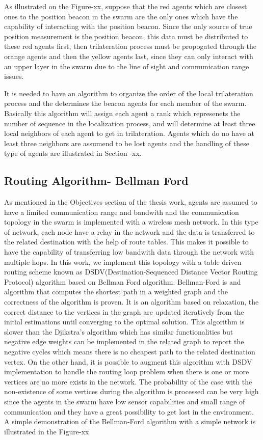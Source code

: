 \documentclass[twoside]{article}
\begin{document}
	As illustrated on the Figure-xx, suppose that the red agents which are closest ones to the position beacon in the swarm are the only ones which have the capability of interacting with the position beacon. Since the only source of true position measurement is the position beacon, this data must be distributed to these red agents first, then trilateration process must be propogated through the orange agents and then the yellow agents last, since they can only interact with an upper layer in the swarm due to the line of sight and communication range issues.
	
	It is needed to have an algorithm to organize the order of the local trilateration process and the determines the beacon agents for each member of the swarm. Basically this algorithm will assign each agent a rank which represenets the number of sequence in the localization process, and will determine at least three local neighbors of each agent to get in trilateration. Agents which do no have at least three neighbors are assumend to be lost agents and the handling of these type of agents are illustrated in Section -xx.
	
	\subsection{Routing Algorithm- Bellman Ford}
	As mentioned in the Objectives section of the thesis work, agents are assumed to have a limited communication range and bandwith and the communication topology in the swarm is implemented with a wireless mesh network. In this type of network, each node have a relay in the network and the data is transferred to the related destination with the help of route tables. This makes it possible to have the capability of transferring low bandwith data through the network with multiple hops.  In this work, we implement this topology with a table driven routing scheme known as DSDV(Destination-Sequenced Distance Vector Routing Protocol) algorithm based on Bellman Ford algorithm. Bellman-Ford is and algorithm that computes the shortest path in a weighted graph and the correctness of the algorithm is proven. It is an algorithm based on relaxation, the correct distance to the vertices in the graph are updated iteratively from the initial estimations until converging to the optimal solution. This algorithm is slower than the Djikstra's algorithm which has similar functionalities but negative edge weights can be implemented in the related graph to report the negative cycles which means there is no cheapest path to the related destination vertex. On the other hand, it is possible to augment this algorithm with DSDV implementation to handle the routing loop problem when there is one or more vertices are no more exists in the network. The probability of the case with the non-existence of some vertices during the algorithm is processed can be very high since the agents in the swarm have low sensor capabilities and small range of communication and they have a great possibility to get lost in the environment. A simple demonstration of the Bellman-Ford algorithm with a simple network is illustrated in the Figure-xx
	
\end{document}
